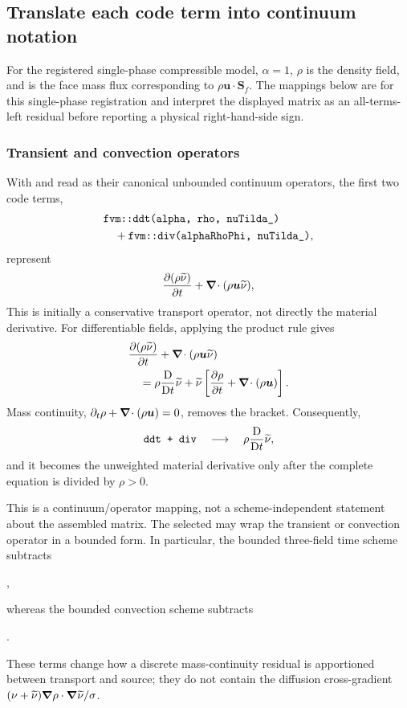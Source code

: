 \subsection{Translate each code term into continuum notation}

For the registered single-phase compressible model, \(\alpha=1\), \(\rho\) is
the density field, and  is the face mass flux corresponding
to \(\rho\boldsymbol u\cdot\boldsymbol S_f\).  The mappings below are for this
single-phase registration and interpret the displayed matrix as an
all-terms-left residual before reporting a physical right-hand-side sign.

\subsubsection{Transient and convection operators}

With  and  read as their canonical unbounded
continuum operators, the first two code terms,
\[
\begin{aligned}
  &\texttt{fvm::ddt(alpha, rho, nuTilda\_)}
  \\
  &\quad+\texttt{fvm::div(alphaRhoPhi, nuTilda\_)},
\end{aligned}
\]
represent
\begin{equation}
  \frac{\partial(\rho\widetilde{\nu})}{\partial t}
  +\boldsymbol{\nabla}\!\cdot(\rho\boldsymbol u\widetilde{\nu}),
  \label{eq:sa-native-transport-operators}
\end{equation}
This is initially a conservative transport operator, not directly the
material derivative.  For differentiable fields, applying the product rule
gives
\begin{align}
  &\frac{\partial(\rho\widetilde{\nu})}{\partial t}
  +\boldsymbol{\nabla}\!\cdot(\rho\boldsymbol u\widetilde{\nu}) \notag\\
  &\quad={}
  \rho\frac{\mathrm D}{\mathrm Dt}\widetilde{\nu}
  +\widetilde{\nu}
  \left[
    \frac{\partial\rho}{\partial t}
    +\boldsymbol{\nabla}\!\cdot(\rho\boldsymbol u)
  \right].
  \label{eq:sa-native-transport-product-rule}
\end{align}
Mass continuity,
\(\partial_t\rho+\boldsymbol{\nabla}\!\cdot(\rho\boldsymbol u)=0\), removes the bracket.
Consequently,
\[
  \texttt{ddt + div}
  \quad\longrightarrow\quad
  \rho\frac{\mathrm D}{\mathrm Dt}\widetilde{\nu},
\]
and it becomes the unweighted material derivative only after the complete
equation is divided by \(\rho>0\).

This is a continuum/operator mapping, not a scheme-independent statement about
the assembled matrix.  The selected  may wrap the transient
or convection operator in a bounded form.  In particular, the bounded
three-field time scheme subtracts
\begin{center}
  ,
\end{center}
whereas the bounded convection scheme subtracts
\begin{center}
  .
\end{center}
These terms change how a discrete mass-continuity residual is apportioned
between transport and source; they do not contain the diffusion cross-gradient
\((\nu+\widetilde{\nu})\boldsymbol{\nabla}\rho\cdot\boldsymbol{\nabla}\widetilde{\nu}/\sigma\).

